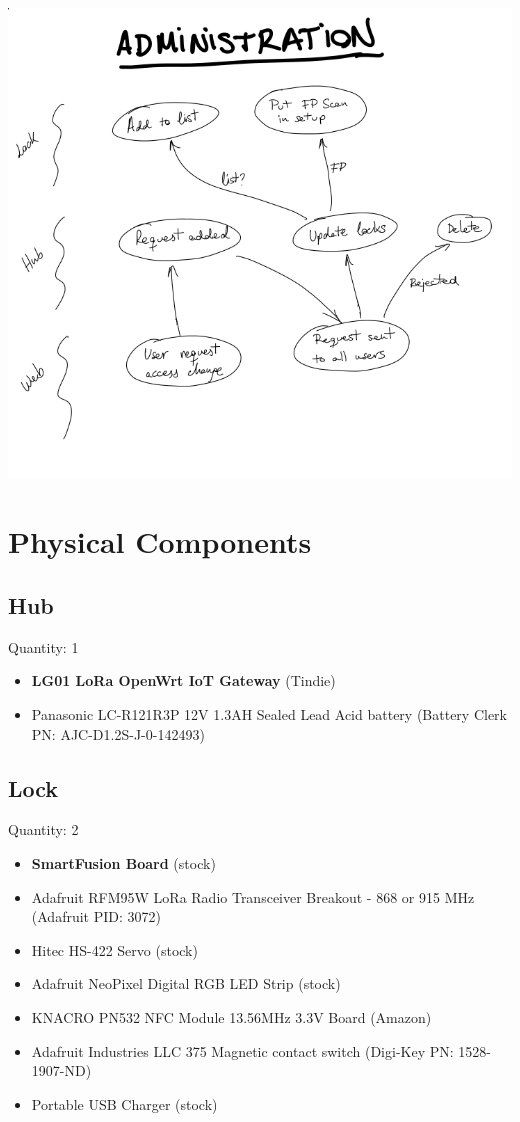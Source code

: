 \documentclass{article}
\begin{document}
\includegraphics[scale=0.4]{admin_graph.png}

\section{Physical Components}


\subsection{Hub}

\noindent
Quantity: 1

\noindent
\begin{itemize}
\item \textbf{LG01 LoRa OpenWrt IoT Gateway} (Tindie)
  \item Panasonic LC-R121R3P 12V 1.3AH Sealed Lead Acid battery (Battery Clerk
    PN: AJC-D1.2S-J-0-142493)
    \end{itemize}


\subsection{Lock}

\noindent
Quantity: 2

\begin{itemize}
  \item \textbf{SmartFusion Board} (stock)
  \item Adafruit RFM95W LoRa Radio Transceiver Breakout - 868 or 915 MHz
    (Adafruit PID: 3072)
  \item Hitec HS-422 Servo (stock)
  \item Adafruit NeoPixel Digital RGB LED Strip (stock)
  \item KNACRO PN532 NFC Module 13.56MHz 3.3V Board (Amazon)
  \item Adafruit Industries LLC 375 Magnetic contact switch (Digi-Key PN: 1528-1907-ND)
  \item Portable USB Charger (stock)
\end{itemize}
\end{document}
